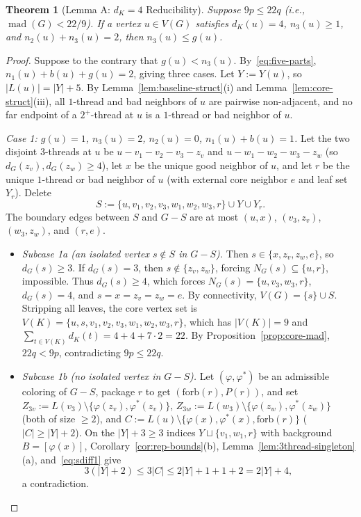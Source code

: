 \documentclass[11pt,a4paper]{article}
\newtheorem{theorem}{Theorem}[section]
\theoremstyle{definition}
\newcommand{\mad}{\operatorname{mad}}
\begin{document}
\begin{theorem}[Lemma A: $d_K=4$ Reducibility]\label{thm:q4}
Suppose $9p \le 22q$ (i.e., $\mad(G) < 22/9$). If a vertex $u \in V(G)$ satisfies $d_K(u) = 4$, $n_3(u) \ge 1$, and $n_2(u) + n_3(u) = 2$, then $n_3(u) \le g(u)$.
\end{theorem}

\begin{proof}
Suppose to the contrary that $g(u) < n_3(u)$. By~\eqref{eq:five-parts}, $n_1(u) + b(u) + g(u) = 2$, giving three cases. Let $Y := Y(u)$, so $|L(u)| = |Y| + 5$. By Lemma~\ref{lem:baseline-struct}(i) and Lemma~\ref{lem:core-struct}(iii), all $1$-thread and bad neighbors of $u$ are pairwise non-adjacent, and no far endpoint of a $2^+$-thread at $u$ is a $1$-thread or bad neighbor of $u$.

\emph{Case 1: $g(u) = 1$, $n_3(u) = 2$, $n_2(u) = 0$, $n_1(u) + b(u) = 1$.}
Let the two disjoint $3$-threads at $u$ be $u - v_1 - v_2 - v_3 - z_v$ and $u - w_1 - w_2 - w_3 - z_w$ (so $d_G(z_v), d_G(z_w) \ge 4$), let $x$ be the unique good neighbor of $u$, and let $r$ be the unique $1$-thread or bad neighbor of $u$ (with external core neighbor $e$ and leaf set $Y_r$). Delete
\[
  S := \{u, v_1, v_2, v_3, w_1, w_2, w_3, r\} \cup Y \cup Y_r.
\]
The boundary edges between $S$ and $G - S$ are at most $(u,x)$, $(v_3, z_v)$, $(w_3, z_w)$, and $(r, e)$.
\begin{itemize}[leftmargin=*,itemsep=2pt]
  \item \emph{Subcase 1a (an isolated vertex $s \notin S$ in $G - S$).} Then $s \in \{x, z_v, z_w, e\}$, so $d_G(s) \ge 3$. If $d_G(s) = 3$, then $s \notin \{z_v, z_w\}$, forcing $N_G(s) \subseteq \{u, r\}$, impossible. Thus $d_G(s) \ge 4$, which forces $N_G(s) = \{u, v_3, w_3, r\}$, $d_G(s) = 4$, and $s = x = z_v = z_w = e$. By connectivity, $V(G) = \{s\} \cup S$. Stripping all leaves, the core vertex set is $V(K) = \{u, s, v_1, v_2, v_3, w_1, w_2, w_3, r\}$, which has $|V(K)| = 9$ and $\sum_{t \in V(K)} d_K(t) = 4 + 4 + 7 \cdot 2 = 22$. By Proposition~\ref{prop:core-mad}, $22q < 9p$, contradicting $9p \le 22q$.
  \item \emph{Subcase 1b (no isolated vertex in $G - S$).} Let $(\varphi, \varphi^*)$ be an admissible coloring of $G - S$, package $r$ to get $(\mathrm{forb}(r), P(r))$, and set $Z_{3v} := L(v_3) \setminus \{\varphi(z_v), \varphi^*(z_v)\}$, $Z_{3w} := L(w_3) \setminus \{\varphi(z_w), \varphi^*(z_w)\}$ (both of size $\ge 2$), and $C := L(u) \setminus \{\varphi(x), \varphi^*(x), \mathrm{forb}(r)\}$ ($|C| \ge |Y| + 2$). On the $|Y|+3 \ge 3$ indices $Y \sqcup \{v_1, w_1, r\}$ with background $B = [\varphi(x)]$, Corollary~\ref{cor:rep-bounds}(b), Lemma~\ref{lem:3thread-singleton}(a), and~\eqref{eq:sdiff1} give
  \[
    3(|Y| + 2) \le 3|C| \le 2|Y| + 1 + 1 + 2 = 2|Y| + 4,
  \]
  a contradiction.
\end{itemize}


\end{proof}
\end{document}

